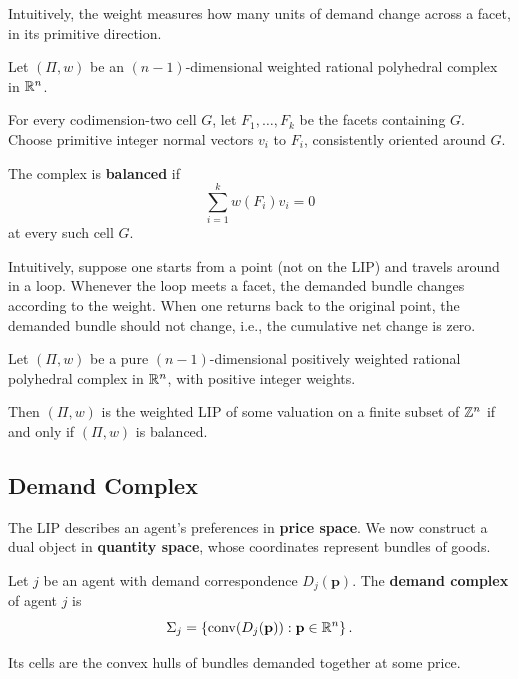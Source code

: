 \documentclass[../../main.tex]{subfiles}
\begin{document}
Intuitively, the weight measures how many units of
demand change across a facet, in its primitive direction.

\begin{defin}
    Let $(\Pi,w)$ be an $(n-1)$-dimensional weighted
    rational polyhedral complex in $\mathbb{R}^n$.

    For every codimension-two cell $G$, let
    $F_1,\dots,F_k$ be the facets containing $G$.
    Choose primitive integer normal vectors $v_i$
    to $F_i$, consistently oriented around $G$.

    The complex is \textbf{balanced} if
    \[
        \sum_{i=1}^k w(F_i)v_i=0
    \]
    at every such cell $G$.

    Intuitively, suppose one starts from a point (not on the LIP) and travels around in a loop. Whenever the loop meets a facet, the demanded bundle changes according to the weight. When one returns back to the original point, the demanded bundle should not change, i.e., the cumulative net change is zero.
\end{defin}


\begin{thm}
    Let $(\Pi,w)$ be a pure $(n-1)$-dimensional
    positively weighted rational polyhedral complex
    in $\mathbb{R}^n$, with positive integer weights.

    Then $(\Pi,w)$ is the weighted LIP of some
    valuation on a finite subset of $\mathbb{Z}^n$
    if and only if $(\Pi,w)$ is balanced.
\end{thm}

\subsection{Demand Complex}

The LIP describes an agent's preferences in \textbf{price space}.
We now construct a dual object in \textbf{quantity space}, whose
coordinates represent bundles of goods.

\begin{defin}
    Let $j$ be an agent with demand correspondence $D_j(\mathbf{p})$.
    The \textbf{demand complex} of agent $j$ is
    \[
        \Sigma_j=\left\{\operatorname{conv}(D_j(\mathbf{p})):\mathbf{p}\in\mathbb{R}^n\right\}.
    \]
    
    Its cells are the convex hulls of bundles demanded 
    together at some price.
\end{defin}
\end{document}

